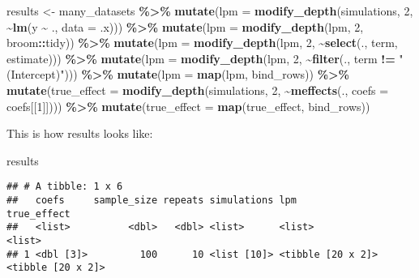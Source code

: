 \documentclass[
]{article}
\newenvironment{Shaded}{\begin{snugshade}}{\end{snugshade}}
\newcommand{\DataTypeTok}[1]{\textcolor[rgb]{0.13,0.29,0.53}{#1}}
\newcommand{\DecValTok}[1]{\textcolor[rgb]{0.00,0.00,0.81}{#1}}
\newcommand{\KeywordTok}[1]{\textcolor[rgb]{0.13,0.29,0.53}{\textbf{#1}}}
\newcommand{\NormalTok}[1]{#1}
\newcommand{\OperatorTok}[1]{\textcolor[rgb]{0.81,0.36,0.00}{\textbf{#1}}}
\newcommand{\StringTok}[1]{\textcolor[rgb]{0.31,0.60,0.02}{#1}}
\begin{document}
\begin{Shaded}
\begin{Highlighting}[]
\NormalTok{results \textless{}{-}}\StringTok{ }\NormalTok{many\_datasets }\OperatorTok{\%\textgreater{}\%}\StringTok{ }
\StringTok{  }\KeywordTok{mutate}\NormalTok{(}\DataTypeTok{lpm =} \KeywordTok{modify\_depth}\NormalTok{(simulations, }\DecValTok{2}\NormalTok{, }\OperatorTok{\textasciitilde{}}\KeywordTok{lm}\NormalTok{(y }\OperatorTok{\textasciitilde{}}\StringTok{ }\NormalTok{., }\DataTypeTok{data =}\NormalTok{ .x))) }\OperatorTok{\%\textgreater{}\%}\StringTok{ }
\StringTok{  }\KeywordTok{mutate}\NormalTok{(}\DataTypeTok{lpm =} \KeywordTok{modify\_depth}\NormalTok{(lpm, }\DecValTok{2}\NormalTok{, broom}\OperatorTok{::}\NormalTok{tidy)) }\OperatorTok{\%\textgreater{}\%}\StringTok{ }
\StringTok{  }\KeywordTok{mutate}\NormalTok{(}\DataTypeTok{lpm =} \KeywordTok{modify\_depth}\NormalTok{(lpm, }\DecValTok{2}\NormalTok{, }\OperatorTok{\textasciitilde{}}\KeywordTok{select}\NormalTok{(., term, estimate))) }\OperatorTok{\%\textgreater{}\%}\StringTok{ }
\StringTok{  }\KeywordTok{mutate}\NormalTok{(}\DataTypeTok{lpm =} \KeywordTok{modify\_depth}\NormalTok{(lpm, }\DecValTok{2}\NormalTok{, }\OperatorTok{\textasciitilde{}}\KeywordTok{filter}\NormalTok{(., term }\OperatorTok{!=}\StringTok{ "(Intercept)"}\NormalTok{))) }\OperatorTok{\%\textgreater{}\%}\StringTok{ }
\StringTok{  }\KeywordTok{mutate}\NormalTok{(}\DataTypeTok{lpm =} \KeywordTok{map}\NormalTok{(lpm, bind\_rows)) }\OperatorTok{\%\textgreater{}\%}\StringTok{ }
\StringTok{  }\KeywordTok{mutate}\NormalTok{(}\DataTypeTok{true\_effect =} \KeywordTok{modify\_depth}\NormalTok{(simulations, }\DecValTok{2}\NormalTok{, }\OperatorTok{\textasciitilde{}}\KeywordTok{meffects}\NormalTok{(., }\DataTypeTok{coefs =}\NormalTok{ coefs[[}\DecValTok{1}\NormalTok{]]))) }\OperatorTok{\%\textgreater{}\%}\StringTok{ }
\StringTok{  }\KeywordTok{mutate}\NormalTok{(}\DataTypeTok{true\_effect =} \KeywordTok{map}\NormalTok{(true\_effect, bind\_rows))}
\end{Highlighting}
\end{Shaded}

This is how results looks like:

\begin{Shaded}
\begin{Highlighting}[]
\NormalTok{results}
\end{Highlighting}
\end{Shaded}

\begin{verbatim}
## # A tibble: 1 x 6
##   coefs     sample_size repeats simulations lpm               true_effect      
##   <list>          <dbl>   <dbl> <list>      <list>            <list>           
## 1 <dbl [3]>         100      10 <list [10]> <tibble [20 x 2]> <tibble [20 x 2]>
\end{verbatim}
\end{document}
